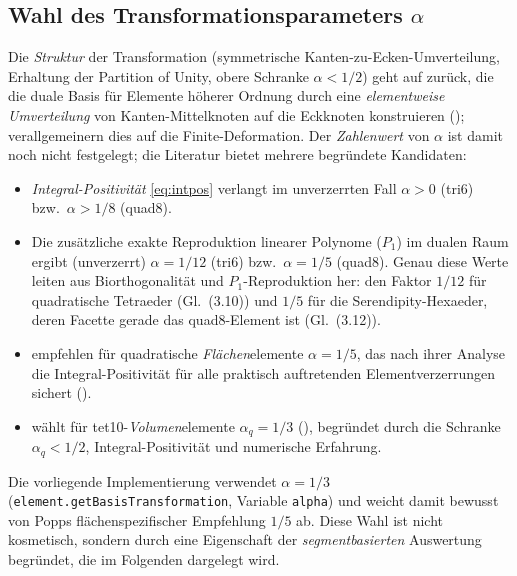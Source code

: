 \documentclass[a4paper,11pt]{article}
\def\tfrac#1#2{#1/#2}%
\newcommand{\code}[1]{\texttt{\small #1}}
\begin{document}
\subsection{Wahl des Transformationsparameters $\alpha$}
\label{sec:alphachoice}
Die \emph{Struktur} der Transformation (symmetrische Kanten-zu-Ecken-Umverteilung, Erhaltung der
Partition of Unity, obere Schranke $\alpha<\tfrac12$) geht auf \citet{lamichhane2005}
zurück, die die duale Basis für Elemente höherer Ordnung durch eine
\emph{elementweise Umverteilung} von Kanten-Mittelknoten auf die Eckknoten konstruieren
(\citealp[Gl.~(3.10)/(3.12)]{lamichhane2005}); \citet{popp2012} verallgemeinern dies auf die
Finite-Deformation. Der \emph{Zahlenwert} von $\alpha$ ist damit noch nicht festgelegt; die Literatur
bietet mehrere begründete Kandidaten:
\begin{itemize}\itemsep2pt
  \item \emph{Integral-Positivität} \eqref{eq:intpos} verlangt im unverzerrten Fall $\alpha>0$
        (tri6) bzw.\ $\alpha>\tfrac18$ (quad8).
  \item Die zusätzliche exakte Reproduktion linearer Polynome ($P_1$) im dualen Raum ergibt
        (unverzerrt) $\alpha=\tfrac{1}{12}$ (tri6) bzw.\ $\alpha=\tfrac15$ (quad8). Genau diese Werte
        leiten \citet{lamichhane2005} aus Biorthogonalität und $P_1$-Reproduktion her: den Faktor
        $\tfrac{1}{12}$ für quadratische Tetraeder (Gl.~(3.10)) und $\tfrac15$ für die
        Serendipity-Hexaeder, deren Facette gerade das quad8-Element ist (Gl.~(3.12)).
  \item \citet{popp2012} empfehlen für quadratische \emph{Flächen}elemente
        $\alpha=\tfrac15$, das nach ihrer Analyse die Integral-Positivität für alle praktisch
        auftretenden Elementverzerrungen sichert (\citealp[S.~B431]{popp2012}).
  \item \citet{farah} wählt für tet10-\emph{Volumen}elemente $\alpha_q=\tfrac13$
        (\citealp[Gl.~(6.20), S.~164]{farah}), begründet durch die Schranke $\alpha_q<\tfrac12$,
        Integral-Positivität und numerische Erfahrung.
\end{itemize}
Die vorliegende Implementierung verwendet $\alpha=\tfrac13$ (\code{element.getBasisTransformation}, Variable \code{alpha}) und weicht damit
bewusst von Popps flächenspezifischer Empfehlung $\tfrac15$ ab. Diese Wahl ist nicht kosmetisch,
sondern durch eine Eigenschaft der \emph{segmentbasierten} Auswertung begründet, die im Folgenden
dargelegt wird.
\end{document}
